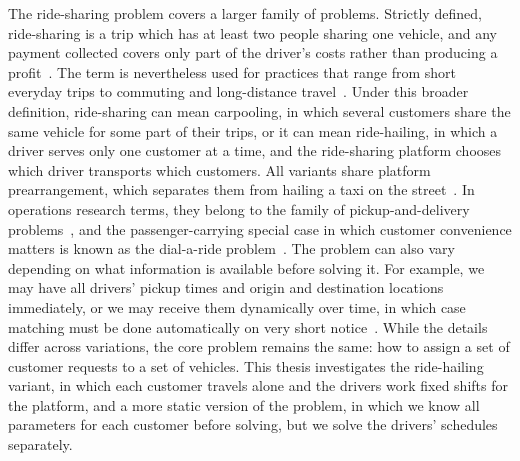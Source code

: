 The ride-sharing problem covers a larger family of problems. Strictly defined, ride-sharing is a trip which has at least two people sharing one vehicle, and any payment collected covers only part of the driver's costs rather than producing a profit~\citep{furuhata2013ridesharing,chan2012ridesharing,mitropoulos2021systematic}. The term is nevertheless used for practices that range from short everyday trips to commuting and long-distance travel~\citep{pigalle2023ridesharing}. Under this broader definition, ride-sharing can mean carpooling, in which several customers share the same vehicle for some part of their trips, or it can mean ride-hailing, in which a driver serves only one customer at a time, and the ride-sharing platform chooses which driver transports which customers. All variants share platform prearrangement, which separates them from hailing a taxi on the street~\citep{furuhata2013ridesharing}. In operations research terms, they belong to the family of pickup-and-delivery problems~\citep{savelsbergh1995general}, and the passenger-carrying special case in which customer convenience matters is known as the dial-a-ride problem~\citep{cordeau2007dialaride}. The problem can also vary depending on what information is available before solving it. For example, we may have all drivers' pickup times and origin and destination locations immediately, or we may receive them dynamically over time, in which case matching must be done automatically on very short notice~\citep{agatz2012optimization,berbeglia2010dynamic}. While the details differ across variations, the core problem remains the same: how to assign a set of customer requests to a set of vehicles. This thesis investigates the ride-hailing variant, in which each customer travels alone and the drivers work fixed shifts for the platform, and a more static version of the problem, in which we know all parameters for each customer before solving, but we solve the drivers' schedules separately.

